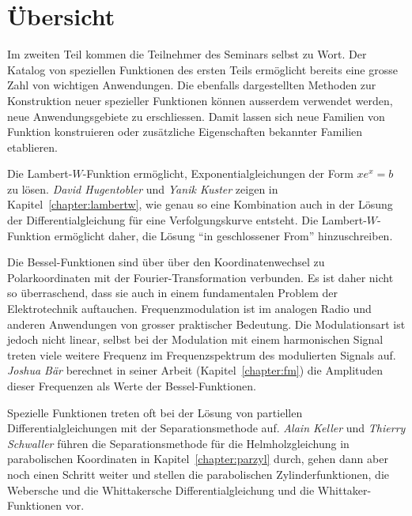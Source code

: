 %
%
%
\chapter*{Übersicht}
\rhead{}
\label{buch:uebersicht}
Im zweiten Teil kommen die Teilnehmer des Seminars selbst zu Wort.
Der Katalog von speziellen Funktionen des ersten Teils ermöglicht
bereits eine grosse Zahl von wichtigen Anwendungen.
Die ebenfalls dargestellten Methoden zur Konstruktion neuer spezieller
Funktionen können ausserdem verwendet werden, neue Anwendungsgebiete
zu erschliessen.
Damit lassen sich neue Familien von Funktion konstruieren oder 
zusätzliche Eigenschaften bekannter Familien etablieren.

Die Lambert-$W$-Funktion ermöglicht, Exponentialgleichungen der
Form $xe^x=b$ zu lösen.
{\em David Hugentobler}
%
%
und
{\em Yanik Kuster}
%
%
zeigen in Kapitel~\ref{chapter:lambertw}, wie genau so eine Kombination
auch in der Lösung der Differentialgleichung für eine Verfolgungskurve
entsteht.
Die Lambert-$W$-Funktion ermöglicht daher, die Lösung ``in geschlossener
From'' hinzuschreiben.

Die Bessel-Funktionen sind über über den Koordinatenwechsel zu
Polarkoordinaten mit der Fourier-Transformation verbunden.
Es ist daher nicht so überraschend, dass sie auch in einem 
fundamentalen Problem der Elektrotechnik auftauchen.
Frequenzmodulation ist im analogen Radio und anderen Anwendungen
von grosser praktischer Bedeutung.
Die Modulationsart ist jedoch nicht linear, selbst bei der Modulation
mit einem harmonischen Signal treten viele weitere Frequenz im 
Frequenzspektrum des modulierten Signals auf.
{\em Joshua Bär}
%
%
berechnet in seiner Arbeit (Kapitel~\ref{chapter:fm}) die Amplituden
dieser Frequenzen als Werte der Bessel-Funktionen.

Spezielle Funktionen treten oft bei der Lösung von
partiellen Differentialgleichungen mit der Separationsmethode auf.
{\em Alain Keller} 
%
%
und
{\em Thierry Schwaller}
%
%
führen die Separationsmethode für die Helmholzgleichung in parabolischen
Koordinaten in Kapitel~\ref{chapter:parzyl}
durch, gehen dann aber noch einen Schritt weiter und 
stellen die parabolischen Zylinderfunktionen,
die Webersche und die Whittakersche Differentialgleichung und die
Whittaker-Funktionen vor.

